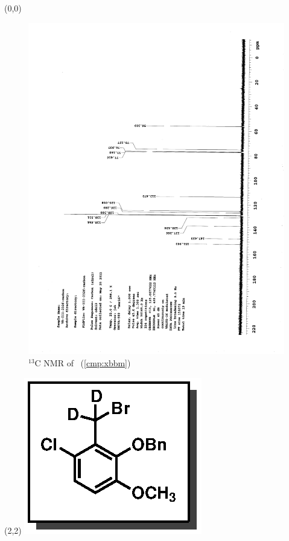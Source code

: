 \clearpage
\begin{textblock}{20}(0,0)
\begin{figure}[htb]
\caption{$^{13}$C NMR of  \CMPxbbm\ (\ref{cmp:xbbm})}
\includegraphics[scale=0.75, trim = 0mm 0mm 0mm 5mm,
clip]{chp_singlecarbon/images/nmr/xbbmC}
\vspace{-100pt}
\end{figure}
\end{textblock}
\begin{textblock}{1}(2,2)
\includegraphics[scale=0.8, angle=90]{chp_singlecarbon/images/xbbm}
\end{textblock}
\clearpage

